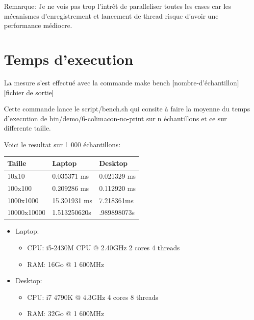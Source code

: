 \documentclass[a4paper]{article}
\begin{document}
Remarque: Je ne vois pas trop l'intrêt de paralleliser toutes les cases car
les mécanismes d'enregistrement et lancement de thread risque d'avoir une
performance médiocre.

\section{Temps d'execution}

La mesure s'est effectué avec la commande make bench [nombre-d'échantillon]
[fichier de sortie]

Cette commande lance le script/bench.sh qui consite à faire la moyenne du temps
d'execution de bin/demo/6-colimacon-no-print sur n échantillons et ce sur
differente taille.

Voici le resultat sur 1 000 échantillons:

\begin{tabular}{|l|l|l|}
  \hline
  Taille & Laptop & Desktop \\
  \hline
  10x10 & 0.035371 ms & 0.021329 ms\\
  \hline
  100x100 & 0.209286 ms & 0.112920 ms \\
  \hline
  1000x1000 & 15.301931 ms & 7.218361ms \\
  \hline
  10000x10000 & 1.513250620s & .989898073s \\
  \hline
\end{tabular}


\begin{itemize}
  \item Laptop:
    \begin{itemize}
      \item CPU: i5-2430M CPU @ 2.40GHz 2 cores 4 threads
      \item RAM: 16Go @ 1 600MHz
    \end{itemize}
  \item Desktop:
    \begin{itemize}
      \item CPU: i7 4790K @ 4.3GHz 4 cores 8 threads
      \item RAM: 32Go @ 1 600MHz
    \end{itemize}
\end{itemize}


\end{document}
